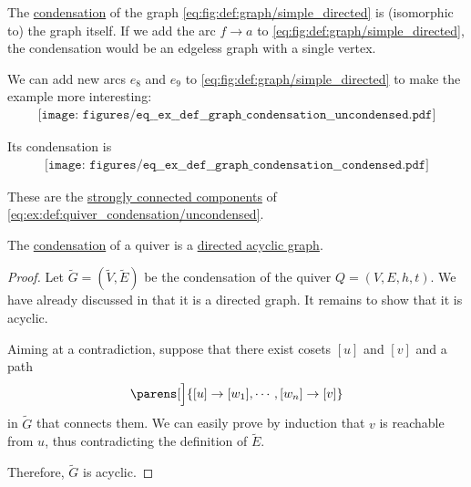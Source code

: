 \begin{example}\label{ex:def:quiver_condensation}
  The \hyperref[def:quiver_condensation]{condensation} of the graph \eqref{eq:fig:def:graph/simple_directed} is (isomorphic to) the graph itself. If we add the arc \( f \to a \) to \eqref{eq:fig:def:graph/simple_directed}, the condensation would be an edgeless graph with a single vertex.

  We can add new arcs \( e_8 \) and \( e_9 \) to \eqref{eq:fig:def:graph/simple_directed} to make the example more interesting:
  \begin{equation}\label{eq:ex:def:quiver_condensation/uncondensed}
    \begin{aligned}
      \texttt{[image: figures/eq\_\_ex\_\_def\_\_graph\_condensation\_\_uncondensed.pdf]}
    \end{aligned}
  \end{equation}

  Its condensation is
  \begin{equation}\label{eq:ex:def:quiver_condensation/condensed}
    \begin{aligned}
      \texttt{[image: figures/eq\_\_ex\_\_def\_\_graph\_condensation\_\_condensed.pdf]}
    \end{aligned}
  \end{equation}

  These are the \hyperref[def:quiver_connectedness/strong]{strongly connected components} of \eqref{eq:ex:def:quiver_condensation/uncondensed}.
\end{example}

\begin{proposition}\label{thm:graph_condensation_is_acyclic_dag}
  The \hyperref[def:quiver_condensation]{condensation} of a quiver is a \hyperref[def:quiver_cycle]{directed acyclic graph}.
\end{proposition}
\begin{proof}
  Let \( \widetilde{G} = (\widetilde{V}, \widetilde{E}) \) be the condensation of the quiver \( Q = (V, E, h, t) \). We have already discussed in  that it is a directed graph. It remains to show that it is acyclic.

  Aiming at a contradiction, suppose that there exist cosets \( [u] \) and \( [v] \) and a path
  \begin{equation*}
    \parens[\Big]{ [u] \to [w_1], \cdots, [w_n] \to [v] }
  \end{equation*}
  in \( \widetilde{G} \) that connects them. We can easily prove by induction that \( v \) is reachable from \( u \), thus contradicting the definition of \( \widetilde{E} \).

  Therefore, \( \widetilde{G} \) is acyclic.
\end{proof}

